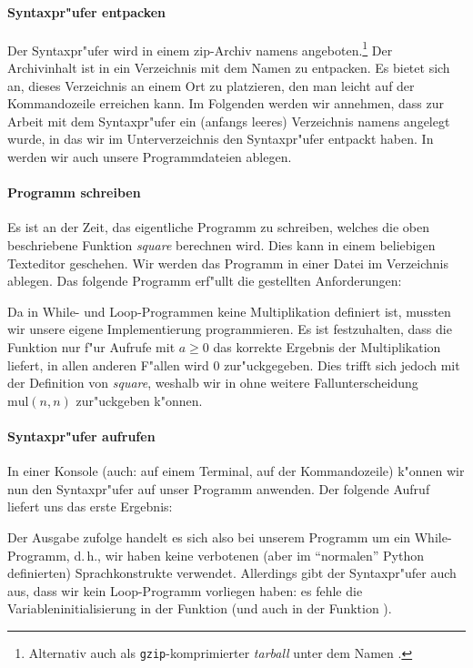 \documentclass[a4paper,ngerman]{article}
\newcommand{\dH}{d.\,h.}
\begin{document}
\paragraph{Syntaxpr"ufer entpacken}
Der Syntaxpr"ufer wird in einem zip-Archiv namens
 angeboten.\footnote{Alternativ auch als
\texttt{gzip}-komprimierter \emph{tarball} unter dem Namen
.} Der Archivinhalt ist in ein Verzeichnis
mit dem Namen  zu entpacken. Es bietet sich an,
dieses Verzeichnis an einem Ort zu platzieren, den man leicht auf der
Kommandozeile erreichen kann. Im Folgenden werden wir annehmen, dass
zur Arbeit mit dem Syntaxpr"ufer ein (anfangs leeres) Verzeichnis
namens  angelegt wurde, in das wir im Unterverzeichnis
 den Syntaxpr"ufer entpackt haben. In 
werden wir auch unsere Programmdateien ablegen.
\paragraph{Programm schreiben}
Es ist an der Zeit, das eigentliche Programm zu schreiben, welches die
oben beschriebene Funktion \emph{square} berechnen wird. Dies kann in
einem beliebigen Texteditor geschehen. Wir werden das Programm in
einer Datei  im Verzeichnis  ablegen. Das
folgende Programm erf"ullt die gestellten Anforderungen:

Da in While- und Loop-Programmen keine Multiplikation definiert ist,
mussten wir unsere eigene Implementierung programmieren. Es ist
festzuhalten, dass die Funktion  nur f"ur Aufrufe mit $a \geq
0$ das korrekte Ergebnis der Multiplikation liefert, in allen anderen
F"allen wird 0 zur"uckgegeben. Dies trifft sich jedoch mit der
Definition von \emph{square}, weshalb wir in  ohne weitere
Fallunterscheidung $\mathrm{mul}(n, n)$ zur"uckgeben k"onnen.
\paragraph{Syntaxpr"ufer aufrufen}
In einer Konsole (auch: auf einem Terminal, auf der Kommandozeile)
k"onnen wir nun den Syntaxpr"ufer auf unser Programm 
anwenden. Der folgende Aufruf liefert uns das erste Ergebnis:
Der Ausgabe zufolge handelt es sich also bei unserem Programm um ein
While-Programm, \dH, wir haben keine verbotenen (aber im "`normalen"'
Python definierten) Sprachkonstrukte verwendet. Allerdings gibt der
Syntaxpr"ufer auch aus, dass wir kein Loop-Programm vorliegen haben:
es fehle die Variableninitialisierung in der Funktion  (und
auch in der Funktion ).
\end{document}
